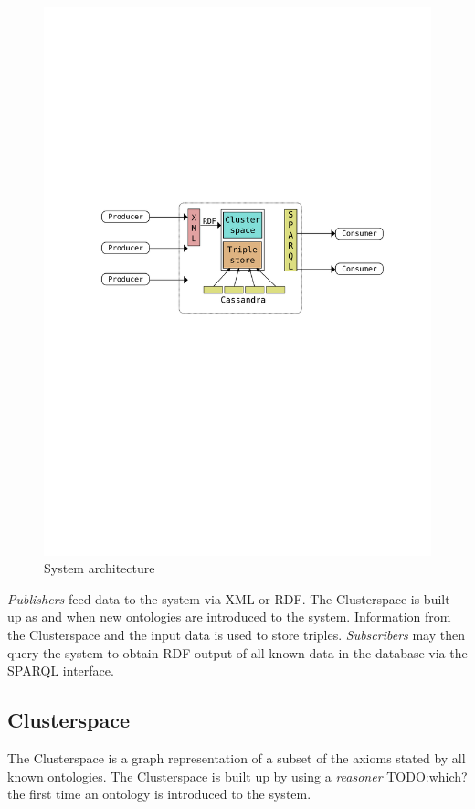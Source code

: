 \documentclass[conference]{IEEEtran}
\begin{document}
\begin{figure}
    \centering
    \includegraphics[scale=0.5]{images/architecture}
    \caption{System architecture}
    \label{fig:architecture}
\end{figure}

\emph{Publishers} feed data to the system via XML or RDF. The Clusterspace is
built up as and when new ontologies are introduced to the system. Information
from the Clusterspace and the input data is used to store triples.
\emph{Subscribers} may then query the system to obtain RDF output of all known
data in the database via the SPARQL interface.

\subsection{Clusterspace}
The Clusterspace is a graph representation of a subset of the axioms stated by
all known ontologies. The Clusterspace is built up by using a \emph{reasoner}
TODO:which? the first time an ontology is introduced to the system.
\end{document}
